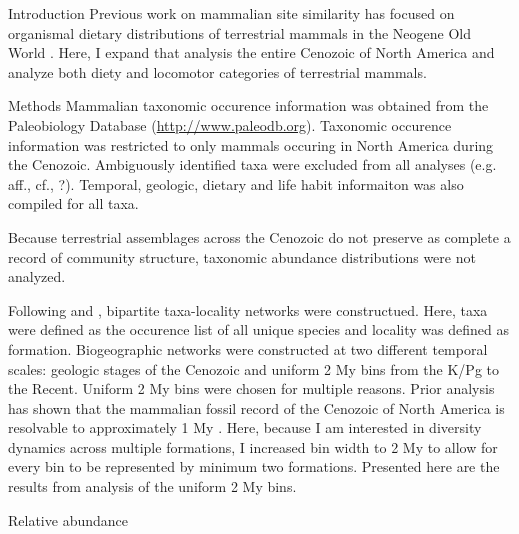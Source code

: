 \documentclass[final]{beamer}\usepackage[]{graphicx}\usepackage[]{color}
\newlength{\onecolwid}
\begin{document}
\begin{frame}[t]
\begin{columns}
\begin{column}{\onecolwid}
\begin{block}{Introduction}
        Previous work on mammalian site similarity has focused on organismal dietary distributions of terrestrial mammals in the Neogene Old World \citep{Jernvall2002,Jernvall2004}. 
        Here, I expand that analysis the entire Cenozoic of North America and analyze both diety and locomotor categories of terrestrial mammals.
      \end{block}

      \begin{footnotesize}
      \begin{block}{Methods}
        Mammalian taxonomic occurence information was obtained from the Paleobiology Database (\url{http://www.paleodb.org}).
        Taxonomic occurence information was restricted to only mammals occuring in North America during the Cenozoic.
        Ambiguously identified taxa were excluded from all analyses (e.g. aff., cf., ?).
        Temporal, geologic, dietary and life habit informaiton was also compiled for all taxa.

        Because terrestrial assemblages across the Cenozoic do not preserve as complete a record of community structure, taxonomic abundance distributions were not analyzed.


        Following \citet{Sidor2013} and \citet{Vilhena2013}, bipartite taxa-locality networks were constructued. 
        Here, taxa were defined as the occurence list of all unique species and locality was defined as formation.
        Biogeographic networks were constructed at two different temporal scales: geologic stages of the Cenozoic and uniform 2 My bins from the K/Pg to the Recent. 
        Uniform 2 My bins were chosen for multiple reasons. 
        Prior analysis has shown that the mammalian fossil record of the Cenozoic of North America is resolvable to approximately 1 My \citet{Alroy1996a,Alroy2000g}. 
        Here, because I am interested in diversity dynamics across multiple formations, I increased bin width to 2 My to allow for every bin to be represented by minimum two formations.
        Presented here are the results from analysis of the uniform 2 My bins. 


      \end{block}
      \end{footnotesize}

      \begin{block}{Relative abundance}
      \end{block}
    \end{column}


\end{columns}
\end{frame}
\end{document}
